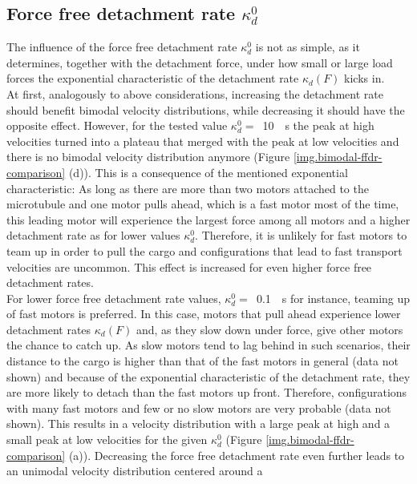 \subsection{Force free detachment rate $\kappa_d^0$}\label{ss.loadfree-detachment-rate}
The influence of the force free detachment rate $\kappa_d^0$ is not as simple, as it determines, together with the detachment force, under how small or large load forces the exponential
characteristic of the detachment rate $\kappa_d\left(F\right)$ kicks in. \\
At first, analogously to above considerations, increasing the detachment rate should benefit bimodal velocity distributions, while
decreasing it should have the opposite effect. However, for the tested value \mbox{$\kappa_d^0 = $ \SI{10}{\per\second}} the peak at high velocities turned into a plateau that merged with the peak
at low velocities and there is no bimodal velocity distribution anymore (Figure \ref{img.bimodal-ffdr-comparison} (d)). This is a consequence of the mentioned exponential characteristic: As long as
there are more than two motors attached to the microtubule and one motor pulls ahead, which is a fast motor most of the time, this leading motor will experience the largest force among all motors
and a higher detachment rate as for lower values $\kappa_d^0$. Therefore, it is unlikely for fast motors to team up in order to pull the cargo and configurations that lead to fast transport
velocities are uncommon. This effect is increased for even higher force free detachment rates. \\
For lower force free detachment rate values, \mbox{$\kappa_d^0 = $ \SI{0.1}{\per\second}} for instance, teaming up of fast motors is preferred. In this case, motors that pull ahead experience
lower detachment rates $\kappa_d\left(F\right)$ and, as they slow down under force, give other motors the chance to catch up. As slow motors tend to lag behind in such scenarios, their distance
to the cargo is higher than that of the fast motors in general (data not shown) and because of the exponential characteristic of the detachment rate, they are more likely to detach than the fast motors up front.
Therefore, configurations with many fast motors and few or no slow motors are very probable (data not shown). This results in a velocity distribution with a large
peak at high and a small peak at low velocities for the given $\kappa_d^0$ (Figure \ref{img.bimodal-ffdr-comparison} (a)). Decreasing the force free detachment rate even further leads to an unimodal velocity distribution centered around a
